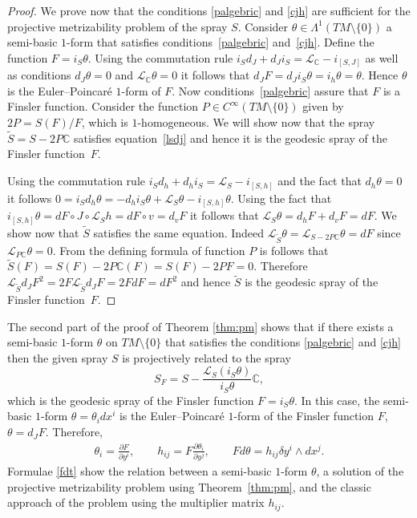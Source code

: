 \begin{proof}
We prove now that the conditions \eqref{palgebric} and \eqref{cjh}  are
suf\/f\/icient for the projective metrizability problem of the spray $S$. Consider $\theta\in \Lambda^1(TM\setminus\{0\})$
a semi-basic $1$-form that sa\-tis\-f\/ies conditions~\eqref{palgebric}
and~\eqref{cjh}. Def\/ine the function $F=i_S\theta$. Using the commutation rule
$i_Sd_J+d_Ji_S=\mathcal{L}_{\mathbb{C}}-i_{[S,J]}$ as well as
conditions $d_J\theta=0$ and $\mathcal{L}_{\mathbb{C}}\theta=0$ it
follows that $d_JF=d_Ji_S\theta=i_h\theta=\theta$. Hence $\theta$
is the Euler--Poincar\'e $1$-form of $F$. Now conditions~\eqref{palgebric} assure that $F$ is a Finsler function. Consider
the function $P\in C^{\infty}(TM\setminus\{0\})$ given by
$2P=S(F)/F$, which is $1$-homogeneous. We will show now that the
spray $\tilde{S}=S-2P\mathbb{C}$ satisf\/ies equation~\eqref{lsdj}
and hence it is the geodesic spray of the Finsler function~$F$.

Using the commutation rule $i_Sd_h+d_hi_S=\mathcal{L}_S-
i_{[S,h]}$ and the fact that $d_h\theta=0$ it follows
$0=i_Sd_h\theta=-d_hi_S\theta+ \mathcal{L}_S\theta-
i_{[S,h]}\theta$. Using the fact that $i_{[S,h]}\theta=dF\circ
J\circ \mathcal{L}_Sh=dF\circ v=d_vF$ it follows that
$\mathcal{L}_S\theta=d_hF+d_vF=dF$. We show now that $\tilde{S}$
satisf\/ies the same equation. Indeed
$\mathcal{L}_{\tilde{S}}\theta=
\mathcal{L}_{S-2P\mathbb{C}}\theta=dF$ since
$\mathcal{L}_{P\mathbb{C}}\theta=0$. From the def\/ining formula of
function $P$ is follows that
$\tilde{S}(F)=S(F)-2P\mathbb{C}(F)=S(F)-2PF=0$. Therefore
$\mathcal{L}_{\tilde{S}}d_JF^2=2F\mathcal{L}_{\tilde{S}}d_JF=2FdF=dF^2$
and hence $\tilde{S}$ is the geodesic spray of the Finsler
function~$F$.
\end{proof}

The second part of the proof of Theorem \ref{thm:pm} shows that if
there exists a semi-basic $1$-form $\theta$ on $TM\setminus\{0\}$ that
satisf\/ies the conditions \eqref{palgebric} and \eqref{cjh} then the
given spray $S$ is projectively related to the spray
\[
 S_F=S-\frac{\mathcal{L}_{S}(i_S\theta)}{i_S\theta}\mathbb{C},
 \]
  which is
the geodesic spray of the Finsler function $F=i_S\theta$. In this
case, the semi-basic $1$-form $\theta=\theta_i dx^i$ is the
Euler--Poincar\'e $1$-form of the Finsler function $F$,
$\theta=d_JF$. Therefore,
\begin{gather} \theta_i=\frac{\partial F}{\partial y^i}, \qquad
  h_{ij}=F\frac{\partial \theta_i}{\partial
    y^j}, \qquad Fd\theta=h_{ij} \delta y^i \wedge
  dx^j. \label{fdt} \end{gather}
Formulae \eqref{fdt} show the relation between a semi-basic $1$-form
$\theta$, a solution of the projective metrizability problem using
Theorem~\ref{thm:pm}, and the classic approach of the problem using the
multiplier matrix $h_{ij}$.


